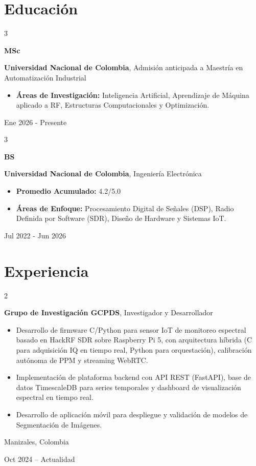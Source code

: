 \documentclass[10pt, letterpaper]{article}
\newenvironment{highlights}{
    \begin{itemize}[
        topsep=0.10 cm,
        parsep=0.10 cm,
        partopsep=0pt,
        itemsep=0pt,
        leftmargin=0.4 cm + 10pt
    ]
}{
    \end{itemize}
} %
\newenvironment{twocolentry}[2][]{
    \onecolentry
    \def\secondColumn{#2}
    \setcolumnwidth{\fill, 4.5 cm}
    \begin{paracol}{2}
}{
    \switchcolumn \raggedleft \secondColumn
    \end{paracol}
    \endonecolentry
} %
\newenvironment{threecolentry}[3][]{
    \onecolentry
    \def\thirdColumn{#3}
    \setcolumnwidth{1 cm, \fill, 4.5 cm}
    \begin{paracol}{3}
    {\raggedright #2} \switchcolumn
}{
    \switchcolumn \raggedleft \thirdColumn
    \end{paracol}
    \endonecolentry
} %
\begin{document}
        \vspace{0.2 cm}

    \section{Educación}

        \begin{threecolentry}{\textbf{MSc}}{
            Ene 2026 - Presente
        }
            \textbf{Universidad Nacional de Colombia}, Admisión anticipada a Maestría en Automatización Industrial
            \begin{highlights}
                \item \textbf{Áreas de Investigación:} Inteligencia Artificial, Aprendizaje de Máquina aplicado a RF, Estructuras Computacionales y Optimización.
            \end{highlights}
        \end{threecolentry}

        \begin{threecolentry}{\textbf{BS}}{
            Jul 2022 - Jun 2026
        }
            \textbf{Universidad Nacional de Colombia}, Ingeniería Electrónica
            \begin{highlights}
                \item \textbf{Promedio Acumulado:} 4.2/5.0
                \item \textbf{Áreas de Enfoque:} Procesamiento Digital de Señales (DSP), Radio Definida por Software (SDR), Diseño de Hardware y Sistemas IoT.
            \end{highlights}
        \end{threecolentry}


    \section{Experiencia}

        \begin{twocolentry}{
            Manizales, Colombia

        Oct 2024 – Actualidad
        }
            \textbf{Grupo de Investigación GCPDS}, Investigador y Desarrollador
            \begin{highlights}
                \item Desarrollo de firmware C/Python para sensor IoT de monitoreo espectral basado en HackRF SDR sobre Raspberry Pi 5, con arquitectura híbrida (C para adquisición IQ en tiempo real, Python para orquestación), calibración autónoma de PPM y streaming WebRTC.
                \item Implementación de plataforma backend con API REST (FastAPI), base de datos TimescaleDB para series temporales y dashboard de visualización espectral en tiempo real.
                \item Desarrollo de aplicación móvil para despliegue y validación de modelos de Segmentación de Imágenes.
            \end{highlights}
        \end{twocolentry}
\end{document}
